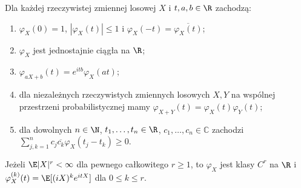\begin{twierdzenie}
Dla każdej rzeczywistej zmiennej losowej $X$ i
$t,a,b\in\R$ zachodzą:
\begin{enumerate}
\item $\varphi_X(0)=1$, $|\varphi_X(t)|\leq1$
 i $\varphi_X(-t)=\overline{\varphi_X(t)}$;
\item $\varphi_X$ jest jednostajnie ciągła na $\R$;
\item $\varphi_{aX+b}(t)=e^{itb}\varphi_X(at)$;
\item dla niezależnych rzeczywistych zmiennych losowych
 $X,Y$ na wspólnej przestrzeni probabilistycznej mamy
 $\varphi_{X+Y}(t)=\varphi_X(t)\varphi_Y(t)$;
\item dla dowolnych $n\in\N$, $t_1,\ldots,t_n\in\R$,
 $c_1,\ldots,c_n\in\mathbb C$ zachodzi
 $\sum_{j,k=1}^n c_j\overline{c_k}\varphi_X(t_j-t_k)\geq0$.
\end{enumerate}
Jeżeli $\E|X|^r<\infty$ dla pewnego całkowitego $r\geq1$,
to $\varphi_X$ jest klasy $C^r$ na $\R$ i
$\varphi_X^{(k)}(t)=\E[(iX)^k e^{itX}]$
dla $0\leq k\leq r$.
\end{twierdzenie}
